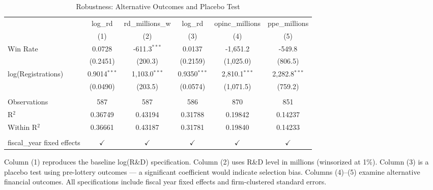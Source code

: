 \begin{table}[htbp]
   \caption{\label{tab:robust} Robustness: Alternative Outcomes and Placebo Test}
   \bigskip
   \centering
   \begin{adjustbox}{max width=\textwidth}
   \begin{tabular}{lccccc}
      \toprule
                                  & log\_rd        & rd\_millions\_w   & log\_rd        & opinc\_millions  & ppe\_millions\\   
                                  & (1)            & (2)               & (3)            & (4)              & (5)\\  
      \midrule 
      Win Rate                    & 0.0728         & -611.3$^{***}$    & 0.0137         & -1,651.2         & -549.8\\   
                                  & (0.2451)       & (200.3)           & (0.2159)       & (1,025.0)        & (806.5)\\   
      log(Registrations)          & 0.9014$^{***}$ & 1,103.0$^{***}$   & 0.9350$^{***}$ & 2,810.1$^{***}$  & 2,282.8$^{***}$\\   
                                  & (0.0490)       & (203.5)           & (0.0574)       & (1,071.5)        & (759.2)\\   
       \\
      Observations                & 587            & 587               & 586            & 870              & 851\\  
      R$^2$                       & 0.36749        & 0.43194           & 0.31788        & 0.19842          & 0.14237\\  
      Within R$^2$                & 0.36661        & 0.43187           & 0.31781        & 0.19840          & 0.14233\\  
       \\
      fiscal\_year fixed effects  & $\checkmark$   & $\checkmark$      & $\checkmark$   & $\checkmark$     & $\checkmark$\\   
      \bottomrule
   \end{tabular}
   \end{adjustbox}

   \par \raggedright 
   Column (1) reproduces the baseline log(R\&D) specification. Column (2) uses R\&D level in millions (winsorized at 1\%). Column (3) is a placebo test using pre-lottery outcomes — a significant coefficient would indicate selection bias. Columns (4)--(5) examine alternative financial outcomes. All specifications include fiscal year fixed effects and firm-clustered standard errors.
\end{table}
